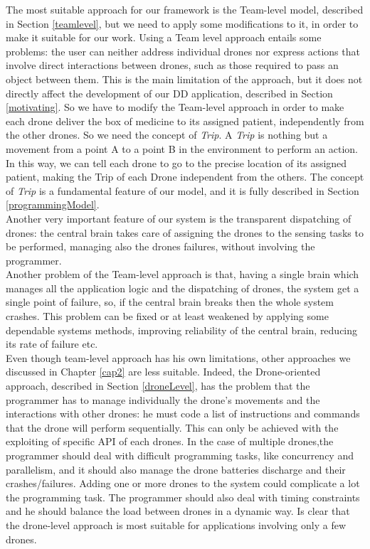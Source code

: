 The most suitable approach for our framework is the Team-level model, described in Section \ref{teamlevel}, but we need to apply some modifications to it, in order to make it suitable for our work.
Using a Team level approach entails some problems:
the user can neither address individual drones nor express actions that involve direct interactions between drones, such as those required to pass an object between them.
This is the main limitation of the approach, but it does not directly affect the development of our DD application, described in Section \ref{motivating}.
So we have to modify the Team-level approach in order to make each drone deliver the box of medicine to its assigned patient, independently from the other drones. 
So we need the concept of \textit{Trip}.
A \textit{Trip} is nothing but a movement from a point A to a point B in the environment to perform an action.
In this way, we can tell each drone to go to the precise location of its assigned patient, making the Trip of each Drone independent from the others.
The concept of \textit{Trip} is a fundamental feature of our model, and it is fully described in Section \ref{programmingModel}.
\\

Another very important feature of our system is the transparent dispatching of drones:
the central brain takes care of assigning the drones to the sensing tasks to be performed, managing also the drones failures, without involving the programmer.
\\

Another problem of the Team-level approach is that, having a single brain which manages all the application logic and the dispatching of drones, the system get a single point of failure, so, if the central brain breaks then the whole system crashes.
This problem can be fixed or at least weakened by applying some dependable systems methods, improving reliability of the central brain, reducing its rate of failure etc.
\\

Even though team-level approach has his own limitations, other approaches we discussed in Chapter \ref{cap2} are less suitable.
Indeed, the Drone-oriented approach, described in Section \ref{droneLevel}, has the problem that the programmer has to manage individually the drone's movements and the interactions with other drones: he must code a list of instructions and commands that the drone will perform sequentially. This can only be achieved with the exploiting of specific API of each drones.
In the case of multiple drones,the programmer should deal with difficult programming tasks, like concurrency and parallelism, and it should also manage the drone batteries discharge and their crashes/failures.
Adding one or more drones to the system could complicate a lot the programming task. The programmer should also deal with timing constraints and he should balance the load between drones in a dynamic way.
Is clear that the drone-level approach is most suitable for applications involving only a few drones.
\\

